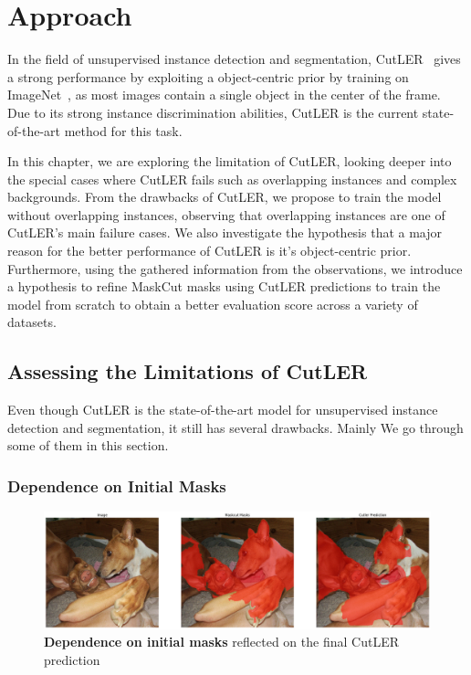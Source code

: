 \chapter{Approach}\label{chap:approach}

In the field of unsupervised instance detection and segmentation, CutLER~\cite{wang2023cut} gives a strong performance by exploiting a object-centric prior by training on ImageNet~\cite{deng2009imagenet}, as most images contain a single
object in the center of the frame.  Due to its strong instance discrimination abilities, CutLER is the current state-of-the-art method for this task.

In this chapter, we are exploring the limitation of CutLER, looking deeper into the special cases where CutLER fails such as overlapping instances and complex backgrounds. From the drawbacks of CutLER, we propose to train the model without overlapping instances, observing that overlapping instances are one of CutLER's main failure cases. We also investigate the hypothesis that a major reason for the better performance of CutLER is it's object-centric prior. Furthermore, using the gathered information from the observations, we introduce a hypothesis to refine MaskCut masks using CutLER predictions to train the model from scratch to obtain a better evaluation score across a variety of datasets.

\section{Assessing the Limitations of CutLER}
Even though CutLER is the state-of-the-art model for unsupervised instance detection and segmentation, it still has several drawbacks. Mainly We go through some of them in this section.

\subsection{Dependence on Initial Masks}
\begin{figure}
	\centering
	\includegraphics[width=1\textwidth]{Images/main/cutler_problem_3.png}
	\caption[\textbf{Dependence on Initial Masks}]{\textbf{Dependence on initial masks} reflected on the final CutLER prediction}
	\label{fig:intial_mask_dependence}
\end{figure}

